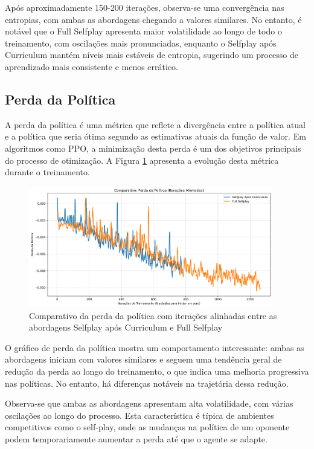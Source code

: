 Após aproximadamente 150-200 iterações, observa-se uma convergência nas entropias, com ambas as abordagens chegando a valores similares. No entanto, é notável que o Full Selfplay apresenta maior volatilidade ao longo de todo o treinamento, com oscilações mais pronunciadas, enquanto o Selfplay após Curriculum mantém níveis mais estáveis de entropia, sugerindo um processo de aprendizado mais consistente e menos errático.

\subsection{Perda da Política}

A perda da política é uma métrica que reflete a divergência entre a política atual e a política que seria ótima segundo as estimativas atuais da função de valor. Em algoritmos como PPO, a minimização desta perda é um dos objetivos principais do processo de otimização. A Figura \ref{fig:policy_loss} apresenta a evolução desta métrica durante o treinamento.

\begin{figure}[H]
    \centering
    \includegraphics[width=0.95\textwidth]{fig/graficos_trabalho/graficos_experimentos/geral/comparativo_perda_politica_alinhado.png}
    \caption{Comparativo da perda da política com iterações alinhadas entre as abordagens Selfplay após Curriculum e Full Selfplay}
    \label{fig:policy_loss}
\end{figure}

O gráfico de perda da política mostra um comportamento interessante: ambas as abordagens iniciam com valores similares e seguem uma tendência geral de redução da perda ao longo do treinamento, o que indica uma melhoria progressiva nas políticas. No entanto, há diferenças notáveis na trajetória dessa redução.

Observa-se que ambas as abordagens apresentam alta volatilidade, com várias oscilações ao longo do processo. Esta característica é típica de ambientes competitivos como o self-play, onde as mudanças na política de um oponente podem temporariamente aumentar a perda até que o agente se adapte.

